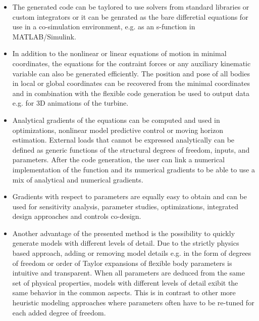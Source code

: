 \documentclass[wes, manuscript]{copernicus}
\begin{document}
\begin{itemize}
\item The generated code can be taylored to use solvers from standard libraries or custom integrators or it can be genrated as the bare differetial equations for use in a co-simulation environment, e.g. as an s-function in MATLAB/Simulink.

\item In addition to the nonlinear or linear equations of motion in minimal coordinates, the equations for the contraint forces or any auxiliary kinematic variable can also be generated efficiently. The position and pose of all bodies in local or global coordinates can be recovered from the minimal coordinates and in combination with the flexible code generation be used to output data e.g. for 3D animations of the turbine.

\item Analytical gradients of the equations can be computed and used in optimizations,
nonlinear model predictive control or moving horizon estimation.
    External loads that cannot be expressed analytically can be defined as generic functions of the structural degrees of freedom, inputs, and parameters.
    After the code generation, the user can link a numerical implementation of the function and its numerical gradients to be able to use a mix of analytical and numerical gradients.
    
\item Gradients with respect to parameters are equally easy to obtain and can be used for sensitivity analysis, parameter studies, optimizations, integrated design approaches and controls co-design.

\item Another advantage of the presented method is the possibility to quickly generate models with different levels of detail.
Due to the strictly physics based approach, adding or removing model details e.g. in the form of degrees of freedom or order of Taylor expansions of flexible body parameters is intuitive and transparent. When all parameters are deduced from the same set of physical properties, models with different levels of detail exibit the same behavior in the common aspects. This is in contrast to other more heuristic modeling approaches where parameters often have to be re-tuned for each added degree of freedom.


\end{itemize}
\end{document}

